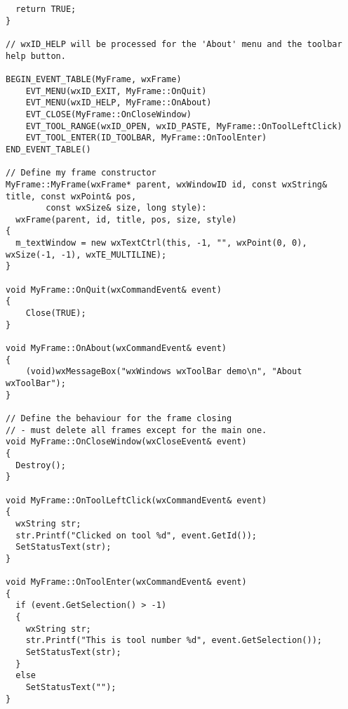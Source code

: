 {\begin{verbatim}
  return TRUE;
}

// wxID_HELP will be processed for the 'About' menu and the toolbar help button.

BEGIN_EVENT_TABLE(MyFrame, wxFrame)
    EVT_MENU(wxID_EXIT, MyFrame::OnQuit)
    EVT_MENU(wxID_HELP, MyFrame::OnAbout)
    EVT_CLOSE(MyFrame::OnCloseWindow)
    EVT_TOOL_RANGE(wxID_OPEN, wxID_PASTE, MyFrame::OnToolLeftClick)
    EVT_TOOL_ENTER(ID_TOOLBAR, MyFrame::OnToolEnter)
END_EVENT_TABLE()

// Define my frame constructor
MyFrame::MyFrame(wxFrame* parent, wxWindowID id, const wxString& title, const wxPoint& pos,
        const wxSize& size, long style):
  wxFrame(parent, id, title, pos, size, style)
{
  m_textWindow = new wxTextCtrl(this, -1, "", wxPoint(0, 0), wxSize(-1, -1), wxTE_MULTILINE);
}

void MyFrame::OnQuit(wxCommandEvent& event)
{
    Close(TRUE);
}

void MyFrame::OnAbout(wxCommandEvent& event)
{
    (void)wxMessageBox("wxWindows wxToolBar demo\n", "About wxToolBar");
}

// Define the behaviour for the frame closing
// - must delete all frames except for the main one.
void MyFrame::OnCloseWindow(wxCloseEvent& event)
{
  Destroy();
}

void MyFrame::OnToolLeftClick(wxCommandEvent& event)
{
  wxString str;
  str.Printf("Clicked on tool %d", event.GetId());
  SetStatusText(str);
}

void MyFrame::OnToolEnter(wxCommandEvent& event)
{
  if (event.GetSelection() > -1)
  {
    wxString str;
    str.Printf("This is tool number %d", event.GetSelection());
    SetStatusText(str);
  }
  else
    SetStatusText("");
}
\end{verbatim}
}

